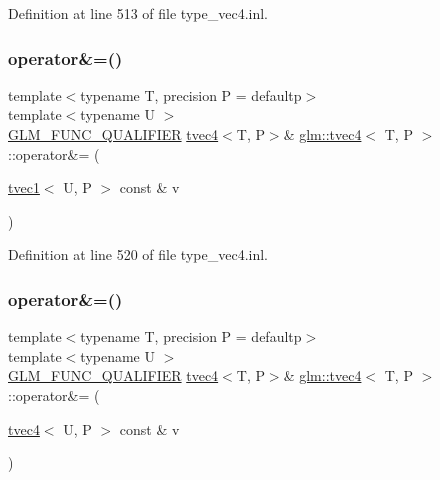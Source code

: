 Definition at line 513 of file type\+\_\+vec4.\+inl.

\mbox{\label{structglm_1_1tvec4_ad19ec50f613001b73a1eae23d9411d71}} 
\subsubsection{\texorpdfstring{operator\&=()}{operator\&=()}\hspace{0.1cm}{\footnotesize\ttfamily [5/6]}}
{\footnotesize\ttfamily template$<$typename T, precision P = defaultp$>$ \\
template$<$typename U $>$ \\
\mbox{\hyperlink{setup_8hpp_a33fdea6f91c5f834105f7415e2a64407}{G\+L\+M\+\_\+\+F\+U\+N\+C\+\_\+\+Q\+U\+A\+L\+I\+F\+I\+ER}} \mbox{\hyperlink{structglm_1_1tvec4}{tvec4}}$<$T, P$>$\& \mbox{\hyperlink{structglm_1_1tvec4}{glm\+::tvec4}}$<$ T, P $>$\+::operator\&= (\begin{DoxyParamCaption}\item[{\mbox{\hyperlink{structglm_1_1tvec1}{tvec1}}$<$ U, P $>$ const \&}]{v }\end{DoxyParamCaption})}



Definition at line 520 of file type\+\_\+vec4.\+inl.

\mbox{\label{structglm_1_1tvec4_a2513499d4dc631ebfc50913c7068caef}} 
\subsubsection{\texorpdfstring{operator\&=()}{operator\&=()}\hspace{0.1cm}{\footnotesize\ttfamily [6/6]}}
{\footnotesize\ttfamily template$<$typename T, precision P = defaultp$>$ \\
template$<$typename U $>$ \\
\mbox{\hyperlink{setup_8hpp_a33fdea6f91c5f834105f7415e2a64407}{G\+L\+M\+\_\+\+F\+U\+N\+C\+\_\+\+Q\+U\+A\+L\+I\+F\+I\+ER}} \mbox{\hyperlink{structglm_1_1tvec4}{tvec4}}$<$T, P$>$\& \mbox{\hyperlink{structglm_1_1tvec4}{glm\+::tvec4}}$<$ T, P $>$\+::operator\&= (\begin{DoxyParamCaption}\item[{\mbox{\hyperlink{structglm_1_1tvec4}{tvec4}}$<$ U, P $>$ const \&}]{v }\end{DoxyParamCaption})}



